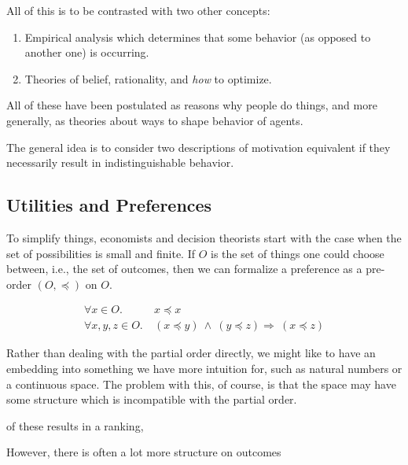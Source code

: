\documentclass{book}
\begin{document}
	
	
	All of this is to be contrasted with two other concepts:

	\begin{enumerate}
		\item Empirical analysis which determines that some behavior (as opposed to another one) is occurring. 
		\item Theories of belief, rationality, and \emph{how} to optimize.
	\end{enumerate}
	
	
	
	All of these have been postulated as reasons why people do things, and more generally, as theories about ways to shape behavior of agents. 
	
	
	
	The general idea is to consider two descriptions of motivation equivalent if they necessarily result in indistinguishable behavior. 
	
	
	\subsection{Utilities and Preferences}
	
	To simplify things, economists and decision theorists start with the case when the set of possibilities is small and finite. If $O$ is the set of things one could choose between, i.e., the set of outcomes, then we can formalize a preference as a pre-order $(O, \preccurlyeq)$ on $O$.
	
	\begin{align*}
		\forall x \in O.&~x \preccurlyeq x \tag{Reflexivity}\\
		\forall x,y,z \in O.&~(x\preccurlyeq y)~\land~( y \preccurlyeq z) \Rightarrow~(x \preccurlyeq z) \tag{Transitivity}
	\end{align*}
	
	Rather than dealing with the partial order directly, we might like to have an embedding into something we have more intuition for, such as natural numbers or a continuous space. The problem with this, of course, is that the space may have some structure which is incompatible with the partial order. 
	
	of these results in a ranking, 
	
	However, there is often a lot more structure on outcomes
	
\end{document}
